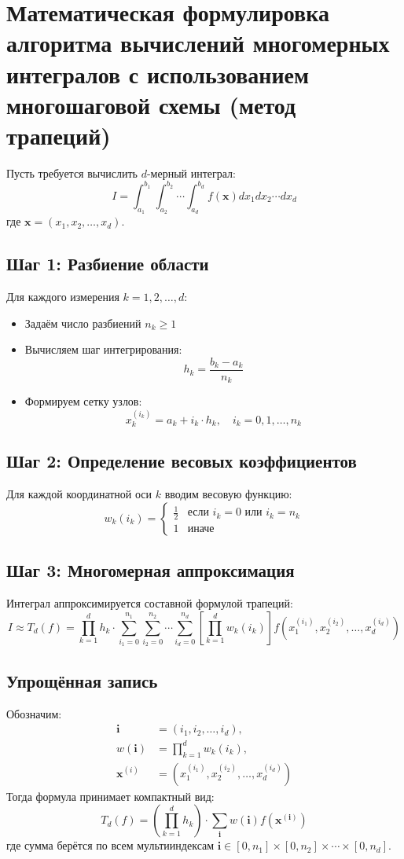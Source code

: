 \documentclass[12pt]{article}
\begin{document}
\section{Математическая формулировка алгоритма вычислений многомерных интегралов с использованием многошаговой схемы (метод трапеций)}
Пусть требуется вычислить $d$-мерный интеграл:
\[
I = \int_{a_1}^{b_1} \int_{a_2}^{b_2} \cdots \int_{a_d}^{b_d} f(\mathbf{x})  dx_1 dx_2 \cdots dx_d
\]
где $\mathbf{x} = (x_1, x_2, \dots, x_d)$.

\subsection*{Шаг 1: Разбиение области}
Для каждого измерения $k = 1, 2, \dots, d$:
\begin{itemize}
    \item Задаём число разбиений $n_k \geq 1$
    \item Вычисляем шаг интегрирования:
    \[
    h_k = \frac{b_k - a_k}{n_k}
    \]
    \item Формируем сетку узлов:
    \[
    x_k^{(i_k)} = a_k + i_k \cdot h_k, \quad i_k = 0, 1, \dots, n_k
    \]
\end{itemize}

\subsection*{Шаг 2: Определение весовых коэффициентов}
Для каждой координатной оси $k$ вводим весовую функцию:
\[
w_k(i_k) = 
\begin{cases} 
\frac{1}{2} & \text{если } i_k = 0 \text{ или } i_k = n_k \\
1 & \text{иначе}
\end{cases}
\]

\subsection*{Шаг 3: Многомерная аппроксимация}
Интеграл аппроксимируется составной формулой трапеций:
\[
I \approx T_d(f) = \prod_{k=1}^{d} h_k \cdot \sum_{i_1=0}^{n_1} \sum_{i_2=0}^{n_2} \cdots \sum_{i_d=0}^{n_d} 
\left[ \prod_{k=1}^{d} w_k(i_k) \right] f\left(x_1^{(i_1)}, x_2^{(i_2)}, \dots, x_d^{(i_d)}\right)
\]

\subsection*{Упрощённая запись}
Обозначим:
\begin{align*}
\mathbf{i} &= (i_1, i_2, \dots, i_d), \\
w(\mathbf{i}) &= \prod_{k=1}^{d} w_k(i_k), \\
\mathbf{x}^{(i)} &= \left( x_1^{(i_1)}, x_2^{(i_2)}, \dots, x_d^{(i_d)} \right)
\end{align*}
Тогда формула принимает компактный вид:
\[
\boxed{
T_d(f) = \left( \prod_{k=1}^{d} h_k \right) \cdot \sum_{\mathbf{i}} w(\mathbf{i})  f(\mathbf{x}^{(\mathbf{i})})
}
\]
где сумма берётся по всем мультииндексам $\mathbf{i} \in [0, n_1] \times [0, n_2] \times \cdots \times [0, n_d]$.
\end{document}
